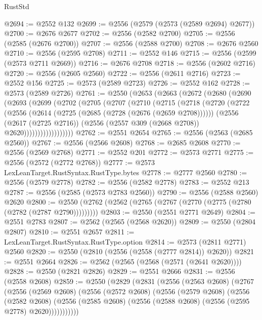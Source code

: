 \begin{lexlean}{RustStd}
\begin{coremodule}
@2694 := @2552 @132
@2699 := @2556 (@2579 (@2573 (@2589 @2694) @2677))
@2700 := @2676 @2677
@2702 := @2556 (@2582 @2700)
@2705 := @2556 (@2585 (@2676 @2700))
@2707 := @2556 (@2588 @2700)
@2708 := @2676 @2560
@2710 := @2556 (@2595 @2708)
@2711 := @2552 @146
@2715 := @2556 (@2599 (@2573 @2711 @2669))
@2716 := @2676 @2708
@2718 := @2556 (@2602 @2716)
@2720 := @2556 (@2605 @2560)
@2722 := @2556 (@2611 @2716)
@2723 := @2552 @156
@2725 := @2573 (@2589 @2723)
@2726 := @2552 @162
@2728 := @2573 (@2589 @2726)
@2761 := @2550
    (@2653
      (@2663
        (@2672
          (@2680
            (@2690
              (@2693
                (@2699
                  (@2702
                    (@2705
                      (@2707
                        (@2710
                          (@2715
                            (@2718
                              (@2720
                                (@2722
                                  (@2556
                                    (@2614 (@2725 (@2685 (@2728 (@2676 (@2659 @2708))))))
                                    (@2556
                                      (@2617 (@2725 @2716))
                                      (@2556 (@2557 @309 (@2668 @2708)) @2620))))))))))))))))))
@2762 := @2551 @2654
@2765 := @2556 (@2563 (@2685 @2560))
@2767 := @2556 (@2566 @2608)
@2768 := @2685 @2608
@2770 := @2556 (@2569 @2768)
@2771 := @2552 @201
@2772 := @2573 @2771
@2775 := @2556 (@2572 (@2772 @2768))
@2777 := @2573 LexLeanTarget.RustSyntax.RustType.bytes
@2778 := @2777 @2560
@2780 := @2556 (@2579 @2778)
@2782 := @2556 (@2582 @2778)
@2783 := @2552 @213
@2787 := @2556 (@2585 (@2573 @2783 @2560))
@2790 := @2556 (@2588 @2560) @2620
@2800 := @2550 (@2762 (@2562 (@2765 (@2767 (@2770 (@2775 (@2780 (@2782 (@2787 @2790)))))))))
@2803 := @2550 (@2551 @2771 @2649)
@2804 := @2551 @2783
@2807 := @2562 (@2565 (@2568 @2620))
@2809 := @2550 (@2804 @2807)
@2810 := @2551 @2657
@2811 := LexLeanTarget.RustSyntax.RustType.option
@2814 := @2573 (@2811 @2771) @2560
@2820 := @2550 (@2810 (@2556 (@2558 (@2777 @2814)) @2620))
@2821 := @2551 @2664
@2826 := @2562 (@2565 (@2568 (@2571 (@2641 @2620))))
@2828 := @2550 (@2821 @2826)
@2829 := @2551 @2666
@2831 := @2556 (@2558 @2608)
@2859 := @2550
    (@2829
      (@2831
        (@2556
          (@2563 @2608)
          (@2767
            (@2556
              (@2569 @2608)
              (@2556
                (@2572 @2608)
                (@2556
                  (@2579 @2608)
                  (@2556
                    (@2582 @2608)
                    (@2556 (@2585 @2608) (@2556 (@2588 @2608) (@2556 (@2595 @2778) @2620)))))))))))

\end{coremodule}
\end{lexlean}
